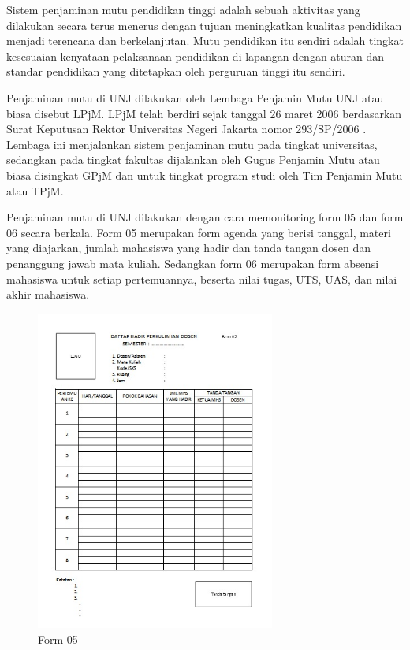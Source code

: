 	Sistem penjaminan mutu pendidikan tinggi adalah sebuah aktivitas yang dilakukan secara terus menerus dengan tujuan meningkatkan kualitas pendidikan menjadi terencana dan berkelanjutan. Mutu pendidikan itu sendiri adalah tingkat kesesuaian kenyataan pelaksanaan pendidikan di lapangan dengan aturan dan standar pendidikan yang ditetapkan oleh perguruan tinggi itu sendiri.

	Penjaminan mutu di UNJ dilakukan oleh Lembaga Penjamin Mutu UNJ atau biasa disebut LPjM. LPjM telah berdiri sejak tanggal 26 maret 2006 berdasarkan Surat Keputusan Rektor Universitas Negeri Jakarta nomor 293/SP/2006 \citep{FMIPA2016}. Lembaga ini menjalankan sistem penjaminan mutu pada tingkat universitas, sedangkan pada tingkat fakultas dijalankan oleh Gugus Penjamin Mutu atau biasa disingkat GPjM dan untuk tingkat program studi oleh Tim Penjamin Mutu atau TPjM.

	Penjaminan mutu di UNJ dilakukan dengan cara memonitoring form 05 dan form 06 secara berkala. Form 05 merupakan form agenda yang berisi tanggal, materi yang diajarkan, jumlah mahasiswa yang hadir dan tanda tangan dosen dan penanggung jawab mata kuliah. Sedangkan form 06 merupakan form absensi mahasiswa untuk setiap pertemuannya, beserta nilai tugas, UTS, UAS, dan nilai akhir mahasiswa.


\begin{figure}[H]
	\centering
	\includegraphics[width=0.7\textwidth]{gambar/form05-gambaran}
	\caption{Form 05}
\end{figure}

